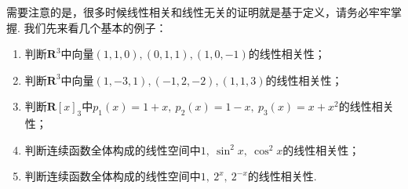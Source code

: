 需要注意的是，很多时候线性相关和线性无关的证明就是基于定义，请务必牢牢掌握. 我们先来看几个基本的例子：
\begin{example}{}{}
    \begin{enumerate}[label=(\arabic*)]
        \item 判断$\mathbf{R}^3$中向量$(1,1,0),(0,1,1),(1,0,-1)$的线性相关性；

        \item 判断$\mathbf{R}^3$中向量$(1,-3,1),(-1,2,-2),(1,1,3)$的线性相关性；

        \item \label{item:3:线性相关性:3}
              判断$\mathbf{R}[x]_3$中$p_1(x)=1+x,\ p_2(x)=1-x,\ p_3(x)=x+x^2$的线性相关性；

        \item 判断连续函数全体构成的线性空间中$1,\ \sin^2x,\ \cos^2x$的线性相关性；

        \item \label{item:3:线性相关性:5}
              判断连续函数全体构成的线性空间中$1,\ 2^x,\ 2^{-x}$的线性相关性.
    \end{enumerate}
\end{example}

